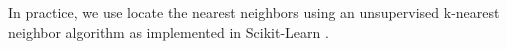 \documentclass[apj, revtex4]{emulateapj}
\begin{document}
In practice, we use locate the nearest neighbors using an unsupervised k-nearest neighbor algorithm as implemented in Scikit-Learn \citep{Pedregosa2012}. 




\end{document}
